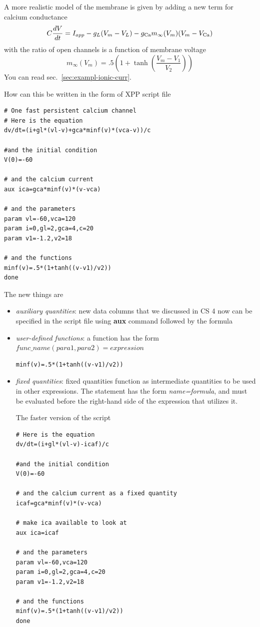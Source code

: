 A more realistic model of the membrane is given by adding a new term
for calcium conductance
\begin{equation}
  \label{eq:125}
  C\frac{dV}{dt} = I_{app} - g_L(V_m-V_L) - g_{\ce{Ca}}m_\infty(V_m) (V_m-V_{\ce{Ca}})
\end{equation}
with the ratio of open channels is a function of membrane voltage
\begin{equation}
  \label{eq:126}
  m_\infty(V_m) = .5 (1 + \tanh (\frac{V_m-V_1}{V_2}))
\end{equation}
You can read sec.~\ref{sec:exampl-ionic-curr}.

How can this be written in the form of XPP script file
\begin{verbatim}
# One fast persistent calcium channel
# Here is the equation
dv/dt=(i+gl*(vl-v)+gca*minf(v)*(vca-v))/c

#and the initial condition
V(0)=-60

# and the calcium current
aux ica=gca*minf(v)*(v-vca)

# and the parameters
param vl=-60,vca=120
param i=0,gl=2,gca=4,c=20
param v1=-1.2,v2=18

# and the functions
minf(v)=.5*(1+tanh((v-v1)/v2))
done
\end{verbatim}

The new things are
\begin{itemize}
\item {\it auxiliary quantities}: new data columns that we discussed in CS
  4 now can be specified in the script file using {\bf aux} command
  followed by the formula

\item {\it user-defined functions}: a function has the form
  $func\_name(para1,para2)=expression$
\begin{verbatim}
minf(v)=.5*(1+tanh((v-v1)/v2))
\end{verbatim}

\item {\it fixed quantities}: fixed quantities function as
  intermediate quantities to be used in other expressions. The
  statement has the form {\it name=formula}, and must be evaluated before
  the right-hand side of the expression that utilizes it.

The faster version of the script
\begin{verbatim}
# Here is the equation
dv/dt=(i+gl*(vl-v)-icaf)/c

#and the initial condition
V(0)=-60

# and the calcium current as a fixed quantity
icaf=gca*minf(v)*(v-vca)

# make ica available to look at
aux ica=icaf

# and the parameters
param vl=-60,vca=120
param i=0,gl=2,gca=4,c=20
param v1=-1.2,v2=18

# and the functions
minf(v)=.5*(1+tanh((v-v1)/v2))
done
\end{verbatim}
\end{itemize}


